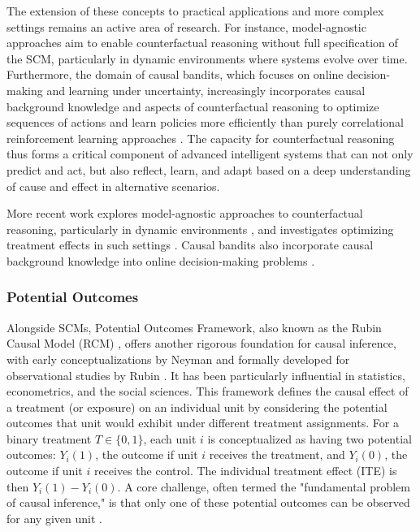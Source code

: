 {{The extension of these concepts to practical applications and more complex settings remains an active area of research. For instance, model-agnostic approaches aim to enable counterfactual reasoning without full specification of the SCM, particularly in dynamic environments where systems evolve over time. Furthermore, the domain of causal bandits, which focuses on online decision-making and learning under uncertainty, increasingly incorporates causal background knowledge and aspects of counterfactual reasoning to optimize sequences of actions and learn policies more efficiently than purely correlational reinforcement learning approaches \cite{Lattimore2016Causal, Lee2018Structural, Zhang2022Causal, Bilodeau2022Adaptively}. The capacity for counterfactual reasoning thus forms a critical component of advanced intelligent systems that can not only predict and act, but also reflect, learn, and adapt based on a deep understanding of cause and effect in alternative scenarios.

More recent work explores model-agnostic approaches to counterfactual reasoning, particularly in dynamic environments \cite{Berrevoets2021ModelAgnostic}, and investigates optimizing treatment effects in such settings \cite{Berrevoets2022Treatment}. Causal bandits also incorporate causal background knowledge into online decision-making problems \cite{Lattimore2016Causal, Lee2018Structural, Zhang2022Causal, Bilodeau2022Adaptively}.


\subsubsection{Potential Outcomes}
\label{subsec:potential_outcomes}

Alongside SCMs, Potential Outcomes Framework, also known as the Rubin Causal Model (RCM) \cite{holland1986statistics}, offers another rigorous foundation for causal inference, with early conceptualizations by Neyman \cite{splawa1990application} and formally developed for observational studies by Rubin \cite{rubin1974estimating}. It has been particularly influential in statistics, econometrics, and the social sciences. This framework defines the causal effect of a treatment (or exposure) on an individual unit by considering the potential outcomes that unit would exhibit under different treatment assignments. For a binary treatment $T \in \{0,1\}$, each unit $i$ is conceptualized as having two potential outcomes: $Y_i(1)$, the outcome if unit $i$ receives the treatment, and $Y_i(0)$, the outcome if unit $i$ receives the control. The individual treatment effect (ITE) is then $Y_i(1) - Y_i(0)$. A core challenge, often termed the "fundamental problem of causal inference," is that only one of these potential outcomes can be observed for any given unit \cite{holland1986statistics}.

}}
